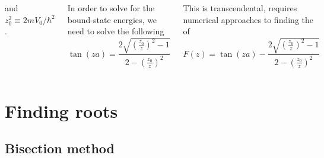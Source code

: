 \documentclass[hyperref={colorlinks=true}]{beamer}
\begin{document}
\begin{frame}[shrink=20]
\begin{columns}
  and $z_0^2 \equiv 2mV_0/\hbar^2$.

  \pause

  In order to solve for the bound-state energies, we need to solve the following
  \begin{equation}
    \tan(za) = \frac{2 \sqrt{ \left( \frac{z_0}{z} \right)^2 - 1 } }{ 2 - \left( \frac{z_0}{z} \right)^2 }
  \end{equation}
  
  \pause
  
  This is transcendental, requires numerical approaches to finding the  of
  \begin{equation}
    F(z) = \tan(za) - \frac{2 \sqrt{ \left( \frac{z_0}{z} \right)^2 - 1 } }{ 2 - \left( \frac{z_0}{z} \right)^2 }
  \end{equation}
  
  
  
  \end{columns}

\end{frame}

\section[Finding roots]{Finding roots}


\subsection[Bisection method]{Bisection method}
\end{document}
